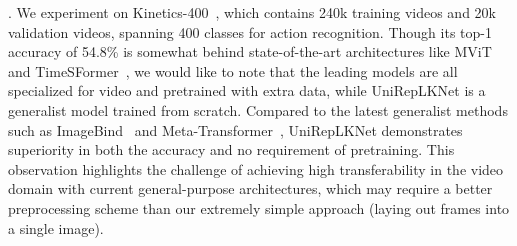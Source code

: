 \documentclass[10pt,twocolumn,letterpaper]{article}
\begin{document}
\begin{table}[t]
    \caption{\textbf{Audio recognition} on Speech Commands V2 dataset.}
    \vspace{-0.1in}
    \label{tab:audio}
    \centering
    \vspace{-0.2in}
\end{table}



. We experiment on Kinetics-400~\citep{kay2017kinetics}, which contains 240k training videos and 20k validation videos, spanning 400 classes for action recognition. Though its top-1 accuracy of 54.8\% is somewhat behind state-of-the-art architectures like MViT~\cite{li2022mvitv2} and TimeSFormer~\cite{bertasius2021space}, we would like to note that the leading models are all specialized for video and pretrained with extra data, while UniRepLKNet is a generalist model trained from scratch. Compared to the latest generalist methods such as ImageBind~\cite{girdhar2023imagebind} and Meta-Transformer~\cite{zhang2023meta}, UniRepLKNet demonstrates superiority in both the accuracy and no requirement of pretraining. This observation highlights the challenge of achieving high transferability in the video domain with current general-purpose architectures, which may require a better preprocessing scheme than our extremely simple approach (laying out frames into a single image).
\end{document}
